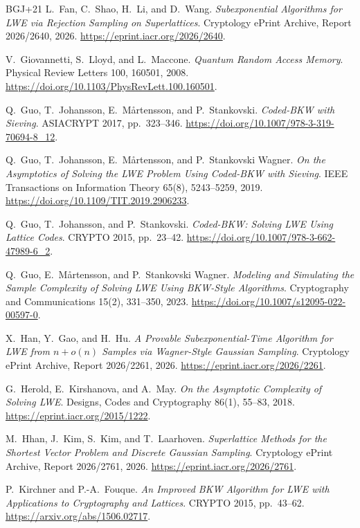\documentclass[runningheads,envcountsame,envcountsect,orivec]{llncs}
\begin{document}
\begin{thebibliography}{BGJ+21}
L.~Fan, C.~Shao, H.~Li, and D.~Wang.
\emph{Subexponential Algorithms for LWE via Rejection Sampling on Superlattices}.
Cryptology ePrint Archive, Report 2026/2640, 2026.
\url{https://eprint.iacr.org/2026/2640}.

V.~Giovannetti, S.~Lloyd, and L.~Maccone.
\emph{Quantum Random Access Memory}.
Physical Review Letters 100, 160501, 2008.
\url{https://doi.org/10.1103/PhysRevLett.100.160501}.

Q.~Guo, T.~Johansson, E.~M{\aa}rtensson, and P.~Stankovski.
\emph{Coded-BKW with Sieving}.
ASIACRYPT 2017, pp.~323--346.
\url{https://doi.org/10.1007/978-3-319-70694-8_12}.

Q.~Guo, T.~Johansson, E.~M{\aa}rtensson, and P.~Stankovski Wagner.
\emph{On the Asymptotics of Solving the LWE Problem Using Coded-BKW with Sieving}.
IEEE Transactions on Information Theory 65(8), 5243--5259, 2019.
\url{https://doi.org/10.1109/TIT.2019.2906233}.

Q.~Guo, T.~Johansson, and P.~Stankovski.
\emph{Coded-BKW: Solving LWE Using Lattice Codes}.
CRYPTO 2015, pp.~23--42.
\url{https://doi.org/10.1007/978-3-662-47989-6_2}.

Q.~Guo, E.~M{\aa}rtensson, and P.~Stankovski Wagner.
\emph{Modeling and Simulating the Sample Complexity of Solving LWE
Using BKW-Style Algorithms}.
Cryptography and Communications 15(2), 331--350, 2023.
\url{https://doi.org/10.1007/s12095-022-00597-0}.

X.~Han, Y.~Gao, and H.~Hu.
\emph{A Provable Subexponential-Time Algorithm for LWE from
$n+o(n)$ Samples via Wagner-Style Gaussian Sampling}.
Cryptology ePrint Archive, Report 2026/2261, 2026.
\url{https://eprint.iacr.org/2026/2261}.

G.~Herold, E.~Kirshanova, and A.~May.
\emph{On the Asymptotic Complexity of Solving LWE}.
Designs, Codes and Cryptography 86(1), 55--83, 2018.
\url{https://eprint.iacr.org/2015/1222}.

M.~Hhan, J.~Kim, S.~Kim, and T.~Laarhoven.
\emph{Superlattice Methods for the Shortest Vector Problem and
Discrete Gaussian Sampling}.
Cryptology ePrint Archive, Report 2026/2761, 2026.
\url{https://eprint.iacr.org/2026/2761}.

P.~Kirchner and P.-A.~Fouque.
\emph{An Improved BKW Algorithm for LWE with Applications to Cryptography and Lattices}.
CRYPTO 2015, pp.~43--62.
\url{https://arxiv.org/abs/1506.02717}.


\end{thebibliography}
\end{document}
